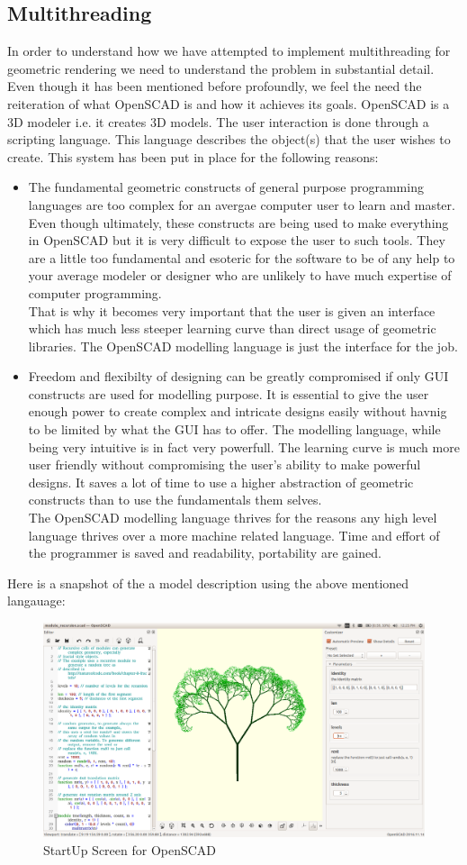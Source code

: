 \subsection{Multithreading}
In order to understand how we have attempted to implement multithreading for geometric rendering we need to understand the problem in substantial detail.\\
Even though it has been mentioned before profoundly, we feel the need the reiteration of what OpenSCAD is and how it achieves its goals. OpenSCAD is a 3D modeler i.e. it creates 3D models. The user interaction is done through a scripting language. This language describes the object(s) that the user wishes to create. This system has been put in place for the following reasons:
\begin{itemize}
	\item The fundamental geometric constructs of general purpose programming languages are too complex for an avergae computer user to learn and master. Even though ultimately, these constructs are being used to make everything in OpenSCAD but it is very difficult to expose the user to such tools. They are a little too fundamental and esoteric for the software to be of any help to your average modeler or designer who are unlikely to have much expertise of computer programming.\\
	That is why it becomes very important that the user is given an interface which has much less steeper learning curve than direct usage of geometric libraries. The OpenSCAD modelling language is just the interface for the job.
	\item Freedom and flexibilty of designing can be greatly compromised if only GUI constructs are used for modelling purpose. It is essential to give the user enough power to create complex and intricate designs easily without havnig to be limited by what the GUI has to offer. The modelling language, while being very intuitive is in fact very powerfull. The learning curve is much more user friendly without compromising the user's ability to make powerful designs. It saves a lot of time to use a higher abstraction of geometric constructs than to use the fundamentals them selves.\\
	The OpenSCAD modelling language thrives for the reasons any high level language thrives over a more machine related language. Time and effort of the programmer is saved and readability, portability are gained.
\end{itemize}
Here is a snapshot of the a model description using the above mentioned langauage:
\begin{figure}
    \centering \includegraphics[width=\linewidth]{images/output/5.png}
    \caption{StartUp Screen for OpenSCAD}
    \label{fig:1}
\end{figure}
